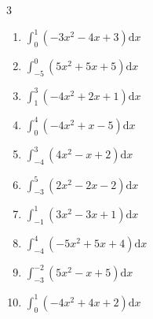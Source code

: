 \begin{multicols}{3}
\begin{enumerate}
\columnbreak %

  \item $\displaystyle \int_{0}^{1}\left( -3x^{2}-4x+3 \right) \mathrm{d}x$


  \item $\displaystyle \int_{-5}^{0}\left( 5x^{2}+5x+5 \right) \mathrm{d}x$

        \phantom{$\displaystyle =150$}

  \item $\displaystyle \int_{1}^{3}\left( -4x^{2}+2x+1 \right) \mathrm{d}x$


  \item $\displaystyle \int_{0}^{4}\left( -4x^{2}+x-5 \right) \mathrm{d}x$


  \item $\displaystyle \int_{-4}^{3}\left( 4x^{2}-x+2 \right) \mathrm{d}x$


\columnbreak %

  \item $\displaystyle \int_{-3}^{5}\left( 2x^{2}-2x-2 \right) \mathrm{d}x$


  \item $\displaystyle \int_{-1}^{1}\left( 3x^{2}-3x+1 \right) \mathrm{d}x$


  \item $\displaystyle \int_{-4}^{4}\left( -5x^{2}+5x+4 \right) \mathrm{d}x$

        \phantom{$\displaystyle =-208$}

  \item $\displaystyle \int_{-3}^{-2}\left( 5x^{2}-x+5 \right) \mathrm{d}x$

        \phantom{$\displaystyle =35$}

  \item $\displaystyle \int_{0}^{1}\left( -4x^{2}+4x+2 \right) \mathrm{d}x$

        \phantom{$\displaystyle =1$}

\columnbreak %


\end{enumerate}
\end{multicols}
